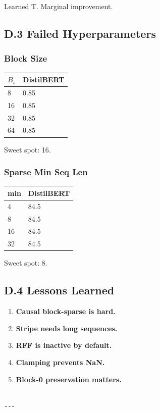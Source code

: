Learned T. Marginal improvement.

\subsection{D.3 Failed Hyperparameters}

\subsubsection{Block Size}

\begin{table}[H]
\centering
\small
\begin{tabular}{ll}
\toprule
\textbf{$B_s$} & \textbf{DistilBERT} \\
\midrule
8 & 0.85 \\
16 & 0.85 \\
32 & 0.85 \\
64 & 0.85 \\
\bottomrule
\end{tabular}
\end{table}

Sweet spot: 16.

\subsubsection{Sparse Min Seq Len}

\begin{table}[H]
\centering
\small
\begin{tabular}{ll}
\toprule
\textbf{min} & \textbf{DistilBERT} \\
\midrule
4 & 84.5 \\
8 & 84.5 \\
16 & 84.5 \\
32 & 84.5 \\
\bottomrule
\end{tabular}
\end{table}

Sweet spot: 8.

\subsection{D.4 Lessons Learned}

\begin{enumerate}
\item \textbf{Causal block-sparse is hard.}
\item \textbf{Stripe needs long sequences.}
\item \textbf{RFF is inactive by default.}
\item \textbf{Clamping prevents NaN.}
\item \textbf{Block-0 preservation matters.}
\end{enumerate}
\begin{lstlisting}

---
\end{lstlisting}

